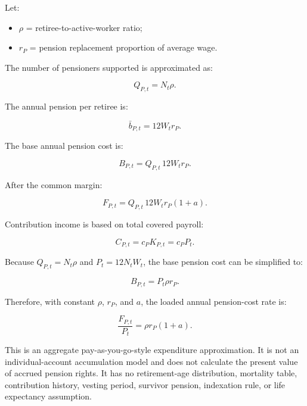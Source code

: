 Let:

\begin{itemize}
  \item $\rho$ = retiree-to-active-worker ratio;
  \item $r_P$ = pension replacement proportion of average wage.
\end{itemize}

The number of pensioners supported is approximated as:

\begin{equation}
Q_{P,t}=N_t\rho.
\end{equation}

The annual pension per retiree is:

\begin{equation}
\bar{b}_{P,t}=12W_tr_P.
\end{equation}

The base annual pension cost is:

\begin{equation}
B_{P,t}=Q_{P,t}\,12W_tr_P.
\end{equation}

After the common margin:

\begin{equation}
F_{P,t}=Q_{P,t}\,12W_tr_P(1+a).
\end{equation}

Contribution income is based on total covered payroll:

\begin{equation}
C_{P,t}=c_PK_{P,t}=c_PP_t.
\end{equation}

Because $Q_{P,t}=N_t\rho$ and $P_t=12N_tW_t$, the base pension cost can be simplified to:

\begin{equation}
B_{P,t}=P_t\rho r_P.
\end{equation}

Therefore, with constant $\rho$, $r_P$, and $a$, the loaded annual pension-cost rate is:

\begin{equation}
\frac{F_{P,t}}{P_t}=\rho r_P(1+a).
\end{equation}

\begin{interpretation}
This is an aggregate pay-as-you-go-style expenditure approximation. It is not an individual-account accumulation model and does not calculate the present value of accrued pension rights. It has no retirement-age distribution, mortality table, contribution history, vesting period, survivor pension, indexation rule, or life expectancy assumption.
\end{interpretation}

